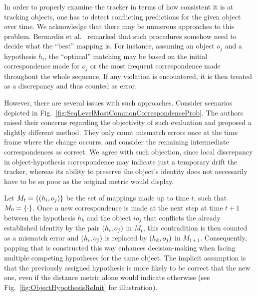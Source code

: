 In order to properly examine the tracker in terms of how consistent it is at tracking objects, one has to detect conflicting predictions for the given object over time. We acknowledge that there may be numerous approaches to this problem. Bernardin et al.~\cite{Bernardin2008} remarked that such procedures somehow need to decide what the ``best'' mapping is. For instance, assuming an object $o_j$ and a hypothesis $h_i$, the ``optimal'' matching may be based on the initial correspondence made for $o_j$ or the most frequent correspondence made throughout the whole sequence. If any violation is encountered, it is then treated as a discrepancy and thus counted as error.

However, there are several issues with such approaches. Consider scenarios depicted in Fig.~\ref{fig:SeqLevelMostCommonCorrespondenceProb}. The authors raised their concerns regarding the objectivity of such evaluation and proposed a slightly different method. They only count mismatch errors once at the time frame where the change occurrs, and consider the remaining intermediate correspondences as correct. We agree with such objection, since local discrepancy in object-hypothesis correspondence may indicate just a temporary drift the tracker, whereas its ability to preserve the object's identity does not necessarily have to be so poor as the original metric would display.

Let $M_t = \left\{ {\left( {h_i, o_j} \right)} \right\}$ be the set of mappings made up to time $t$, such that $M_0 = \left\{ {\cdot} \right\}$. Once a new correspondence is made at the next step at time $t + 1$ between the hypothesis $h_k$ and the object $io_j$ that conflicts the already established identity by the pair $\left( {h_i, o_j} \right)$ in $M_t$, this contradition is then counted as a mismatch error and $\left( {h_i, o_j} \right)$ is replaced by $\left( {h_k, o_j} \right)$ in $M_{t + 1}$. Consequently, papping that is constructed this way enhances decision-making when facing multiple competing hypotheses for the same object. The implicit assumption is that the previously assigned hypothesis is more likely to be correct that the new one, even if the distance metric alone would indicate otherwise (see Fig.~\ref{fig:ObjectHypothesisReInit} for illustration).

